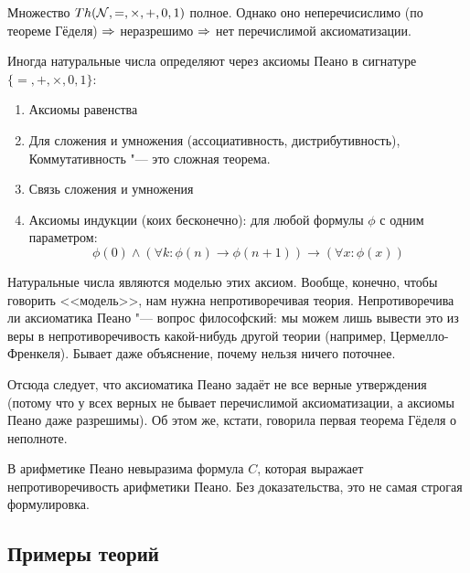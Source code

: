 \begin{conseq}
	Множество $Th(\mathcal{N}, =, \times, +, 0, 1)$ полное.
	Однако оно неперечисислимо (по теореме Гёделя) $\Rightarrow$ неразрешимо $\Rightarrow$ нет перечислимой аксиоматизации.
\end{conseq}
\begin{Rem}
	Иногда натуральные числа определяют через аксиомы Пеано в сигнатуре $\{=, +, \times, 0, 1\}$:
	\begin{enumerate}
	\item Аксиомы равенства
	\item
		Для сложения и умножения (ассоциативность, дистрибутивность),
		Коммутативность "--- это сложная теорема.
	\item Связь сложения и умножения
	\item Аксиомы индукции (коих бесконечно): для любой формулы $\phi$ с одним параметром:
		\[ \phi(0) \land (\forall k \colon \phi(n) \to \phi(n+1)) \to (\forall x \colon \phi(x)) \]
	\end{enumerate}
	Натуральные числа являются моделью этих аксиом.
	Вообще, конечно, чтобы говорить <<модель>>, нам нужна непротиворечивая теория.
	Непротиворечива ли аксиоматика Пеано "--- вопрос философский: мы можем лишь вывести
	это из веры в непротиворечивость какой-нибудь другой теории (например, Цермелло-Френкеля).
	Бывает даже объяснение, почему нельзя ничего поточнее.

	Отсюда следует, что аксиоматика Пеано задаёт не все верные утверждения (потому что
	у всех верных не бывает перечислимой аксиоматизации, а аксиомы Пеано даже разрешимы).
	Об этом же, кстати, говорила первая теорема Гёделя о неполноте.
\end{Rem}
\begin{theorem}
	В арифметике Пеано невыразима формула $C$, которая выражает непротиворечивость
	арифметики Пеано.
	Без доказательства, это не самая строгая формулировка.
\end{theorem}

\subsection{Примеры теорий}
